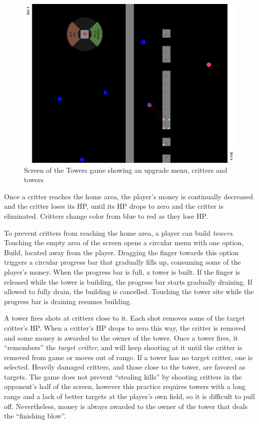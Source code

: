 \documentclass[a4paper,12pt]{article}
\begin{document}
\begin{figure}[ht]\small
    \includegraphics[width=13cm]{scsh-towers}
\caption{Screen of the Towers game showing an upgrade menu, critters and towers}
\label{scsh-towers}
\end{figure}

Once a critter reaches the home area, the player's money is continually
decreased and the critter loses its HP, until its HP drops to zero and the
critter is eliminated.
Critters change color from blue to red as they lose HP.

To prevent critters from reaching the home area, a player can build
\emph{towers}.
Touching the empty area of the screen opens a circular menu with one option,
Build, located away from the player.
Dragging the finger towards this option triggers a circular progress bar that
gradually fills up, consuming some of the player's money.
When the progress bar is full, a tower is built.
If the finger is released while the tower is building, the progress bar
starts gradually draining.
If allowed to fully drain, the building is cancelled.
Touching the tower site while the progress bar is draining resumes building.

A tower fires shots at critters close to it.
Each shot removes some of the target critter's HP.
When a critter's HP drops to zero this way, the critter is removed and some
money is awarded to the owner of the tower.
Once a tower fires, it “remembers” the \emph{target critter}, and will keep
shooting at it until the critter is removed from game or moves out of range.
If a tower has no target critter, one is selected.
Heavily damaged critters, and those close to the tower, are favored as targets.
The game does not prevent “stealing kills” by shooting critters in the
opponent's half of the screen, however this practice requires towers with a
long range and a lack of better targets at the player's own field, so it is
difficult to pull off.
Nevertheless, money is always awarded to the owner of the tower that deals the
“finishing blow”.
\end{document}
